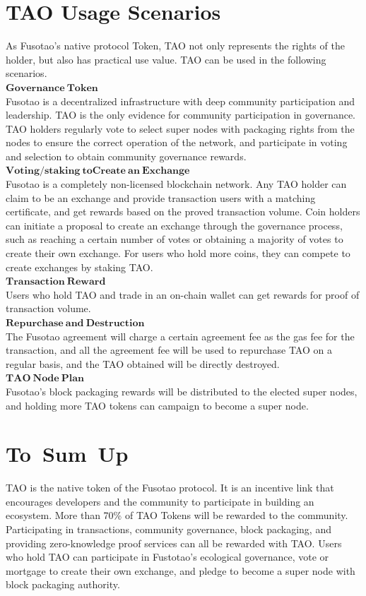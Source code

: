 \documentclass[a4paper,12pt]{article}
\begin{document}
\section{TAO Usage Scenarios}
\label{sec:6}
As Fusotao's native protocol Token, TAO not only represents the rights of the holder, but also has practical use value. TAO can be used in the following scenarios.\\
$\mathbf{Governance\ Token}$\\
Fusotao is a decentralized infrastructure with deep community participation and leadership. TAO is the only evidence for community participation in governance. TAO holders regularly vote to select super nodes with packaging rights from the nodes to ensure the correct operation of the network, and participate in voting and selection to obtain community governance rewards.\\
$\mathbf{Voting/staking\ to Create\ an\ Exchange}$\\
Fusotao is a completely non-licensed blockchain network. Any TAO holder can claim to be an exchange and provide transaction users with a matching certificate, and get rewards based on the proved transaction volume. Coin holders can initiate a proposal to create an exchange through the governance process, such as reaching a certain number of votes or obtaining a majority of votes to create their own exchange. For users who hold more coins, they can compete to create exchanges by staking TAO.\\
$\mathbf{Transaction\ Reward}$\\
Users who hold TAO and trade in an on-chain wallet can get rewards for proof of transaction volume.\\
$\mathbf{Repurchase\ and\ Destruction}$\\
The Fusotao agreement will charge a certain agreement fee as the gas fee for the transaction, and all the agreement fee will be used to repurchase TAO on a regular basis, and the TAO obtained will be directly destroyed.\\
$\mathbf{TAO\ Node\ Plan}$\\
Fusotao's block packaging rewards will be distributed to the elected super nodes, and holding more TAO tokens can campaign to become a super node.\\
\section{To\ Sum\ Up}
\label{sec:7}
TAO is the native token of the Fusotao protocol. It is an incentive link that encourages developers and the community to participate in building an ecosystem. More than 70\% of TAO Tokens will be rewarded to the community. Participating in transactions, community governance, block packaging, and providing zero-knowledge proof services can all be rewarded with TAO. Users who hold TAO can participate in Fustotao's ecological governance, vote or mortgage to create their own exchange, and pledge to become a super node with block packaging authority.\\
\end{document}
